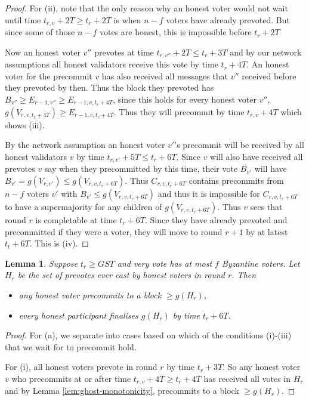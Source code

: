 \documentclass{article}
\newtheorem{lemma}[theorem]{Lemma}
\begin{document}
{\begin{proof}
For (ii), note that the only reason why an honest voter would not wait until time $t_{r,v}+2T \geq t_r+ 2T$ is when $n-f$ voters have already prevoted. But since some of those $n-f$ votes are honest, this is impossible before $t_r+2T$

Now an honest voter $v''$ prevotes at time $t_{r,v''}+2T \leq t_r +3T$ and by our network assumptions all honest validators receive this vote by time $t_r+4T$. An honest voter for the precommit $v$ has also received all messages that $v''$ received before they prevoted by then. Thus the block they prevoted has $B_{v''} \geq E_{r-1,v''} \geq E_{r-1,v,t_r+4T}$, since this holds for every honest voter $v''$, $g(V_{r,v,t_r+4T}) \geq E_{r-1,v,t_r+4T}$. Thus they will precommit by time $t_{r,v}+4T$ which shows (iii).

By the network assumption an honest voter $v'$'s precommit will be received by all honest validators $v$ by time $t_{r,v'}+ 5T \leq t_r+6T$. Since $v$ will also have received all prevotes $v$ say when they precommitted by this time, their vote $B_{v'}$ will have $B_{v'}=g(V_{r,v'}) \leq g(V_{r,v,t_r+6T})$. Thus $C_{r, v, t_r+6T}$ contains precommits from $n-f$ voters $v'$ with $B_{v'} \leq g(V_{r,v,t_r+6T})$ and thus it is impossible for $C_{r,v,t_r+6T}$ to have a supermajority for any children of $g(V_{r,v, t_r+6T})$. Thus $v$ sees that round $r$ is completable at time $t_r+6T$. Since they have already prevoted and precommitted if they were a voter, they will move to round $r+1$ by at latest $t_t+6T$. This is (iv).
\end{proof}

\begin{lemma} \label{lem:honest-prevote-timings}
Suppose $t_r \geq GST$ and very vote has at most $f$ Byzantine voters. Let $H_r$ be the set of prevotes ever cast by honest voters in round $r$. Then
\begin{itemize}
\item[(a)] any honest voter precommits to a block $\geq  g(H_r)$,

\item[(b)] every honest participant finalises $g(H_r)$ by time $t_r+6T$.
\end{itemize}
\end{lemma}

\begin{proof} For (a), we separate into cases based on which of the conditions (i)-(iii) that we wait for to precommit hold.

For (i), all honest voters prevote in round $r$ by time $t_r+3T$. So any honest voter $v$ who precommits at or after time $t_{r,v}+4T \geq t_r+4T$ has received all votes in $H_r$ and by Lemma \ref{lem:ghost-monotonicity}, precommits to a block $\geq g(H_r)$.


\end{proof}}
\end{document}
